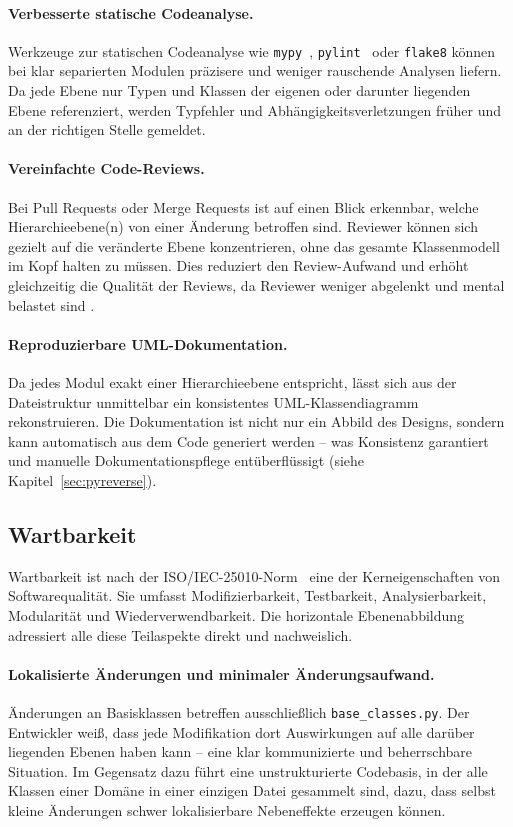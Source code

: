 ﻿\documentclass[a4paper,12pt]{article}
\begin{document}
\paragraph{Verbesserte statische Codeanalyse.}
Werkzeuge zur statischen Codeanalyse wie \texttt{mypy}~\cite{mypy2024},
\texttt{pylint}~\cite{pylint2024} oder \texttt{flake8} können bei klar separierten
Modulen präzisere und weniger rauschende Analysen liefern. Da jede Ebene nur
Typen und Klassen der eigenen oder darunter liegenden Ebene referenziert, werden
Typfehler und Abhängigkeitsverletzungen früher und an der richtigen Stelle gemeldet.

\paragraph{Vereinfachte Code-Reviews.}
Bei Pull Requests oder Merge Requests ist auf einen Blick erkennbar, welche
Hierarchieebene(n) von einer Änderung betroffen sind. Reviewer können sich gezielt
auf die veränderte Ebene konzentrieren, ohne das gesamte Klassenmodell im Kopf
halten zu müssen. Dies reduziert den Review-Aufwand und erhöht gleichzeitig die
Qualität der Reviews, da Reviewer weniger abgelenkt und mental belastet sind
\cite{bird2011}.

\paragraph{Reproduzierbare UML-Dokumentation.}
Da jedes Modul exakt einer Hierarchieebene entspricht, lässt sich aus der
Dateistruktur unmittelbar ein konsistentes UML-Klassendiagramm rekonstruieren.
Die Dokumentation ist nicht nur ein Abbild des Designs, sondern kann automatisch
aus dem Code generiert werden -- was Konsistenz garantiert und manuelle
Dokumentationspflege entüberflüssigt (siehe Kapitel~\ref{sec:pyreverse}).

\subsection{Wartbarkeit}

Wartbarkeit ist nach der ISO/IEC-25010-Norm~\cite{iso25010} eine der Kerneigenschaften
von Softwarequalität. Sie umfasst Modifizierbarkeit, Testbarkeit, Analysierbarkeit,
Modularität und Wiederverwendbarkeit. Die horizontale Ebenenabbildung adressiert
alle diese Teilaspekte direkt und nachweislich.

\paragraph{Lokalisierte Änderungen und minimaler Änderungsaufwand.}
Änderungen an Basisklassen betreffen ausschließlich \texttt{base\_classes.py}.
Der Entwickler weiß, dass jede Modifikation dort Auswirkungen auf alle darüber
liegenden Ebenen haben kann -- eine klar kommunizierte und beherrschbare Situation.
Im Gegensatz dazu führt eine unstrukturierte Codebasis, in der alle Klassen
einer Domäne in einer einzigen Datei gesammelt sind, dazu, dass selbst kleine
Änderungen schwer lokalisierbare Nebeneffekte erzeugen können.
\end{document}
